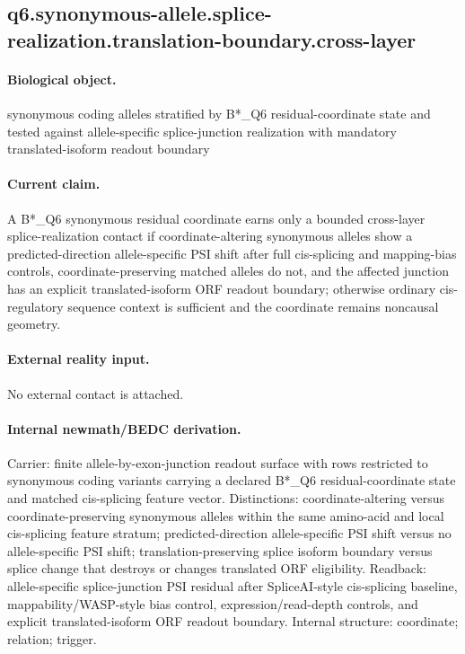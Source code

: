\subsection{q6.synonymous-allele.splice-realization.translation-boundary.cross-layer}

\paragraph{Biological object.} synonymous coding alleles stratified by B*\_Q6 residual-coordinate state and tested against allele-specific splice-junction realization with mandatory translated-isoform readout boundary

\paragraph{Current claim.} A B*\_Q6 synonymous residual coordinate earns only a bounded cross-layer splice-realization contact if coordinate-altering synonymous alleles show a predicted-direction allele-specific PSI shift after full cis-splicing and mapping-bias controls, coordinate-preserving matched alleles do not, and the affected junction has an explicit translated-isoform ORF readout boundary; otherwise ordinary cis-regulatory sequence context is sufficient and the coordinate remains noncausal geometry.

\paragraph{External reality input.}
No external contact is attached.

\paragraph{Internal newmath/BEDC derivation.} Carrier: finite allele-by-exon-junction readout surface with rows restricted to synonymous coding variants carrying a declared B*\_Q6 residual-coordinate state and matched cis-splicing feature vector. Distinctions: coordinate-altering versus coordinate-preserving synonymous alleles within the same amino-acid and local cis-splicing feature stratum; predicted-direction allele-specific PSI shift versus no allele-specific PSI shift; translation-preserving splice isoform boundary versus splice change that destroys or changes translated ORF eligibility. Readback: allele-specific splice-junction PSI residual after SpliceAI-style cis-splicing baseline, mappability/WASP-style bias control, expression/read-depth controls, and explicit translated-isoform ORF readout boundary. Internal structure: coordinate; relation; trigger.

